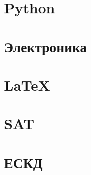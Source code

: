 \documentclass[oneside,12pt]{article}
\newcommand{\py}{Python}
\begin{document}
\section{\py}
\cite{pyotkidach,pythink}

\section{Электроника}
\cite{bcollis}

\section{\LaTeX}
\cite{ebooktex,bibiso,lvovsky}

\section{SAT} 
\cite{geektimes240554,VangliSAT}

\section{ЕСКД}
\cite{
gost2701, gost2702, gost2703, gost2704, gost2705, gost2708, gost2709, gost2710,
gost2711, gost2721, gost2722, gost2723, gost2725, gost2726, gost2727, gost2728,
gost2829, gost2730, gost2731, gost2732, gost2733, gost2734, gost2735, gost2736,
gost2737, gost2741, gost2742, gost2743, gost2744, gost2745, gost2746, gost2747,
gost2751, gost2755, gost2756, gost2758, gost2759, gost2761, gost2762
}

\printbibliography
\end{document}

